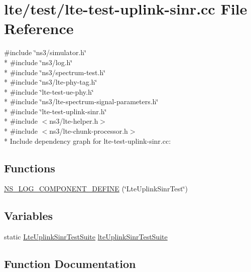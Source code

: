 \hypertarget{lte-test-uplink-sinr_8cc}{}\section{lte/test/lte-\/test-\/uplink-\/sinr.cc File Reference}
\label{lte-test-uplink-sinr_8cc}
{\ttfamily \#include \char`\"{}ns3/simulator.\+h\char`\"{}}\\*
{\ttfamily \#include \char`\"{}ns3/log.\+h\char`\"{}}\\*
{\ttfamily \#include \char`\"{}ns3/spectrum-\/test.\+h\char`\"{}}\\*
{\ttfamily \#include \char`\"{}ns3/lte-\/phy-\/tag.\+h\char`\"{}}\\*
{\ttfamily \#include \char`\"{}lte-\/test-\/ue-\/phy.\+h\char`\"{}}\\*
{\ttfamily \#include \char`\"{}ns3/lte-\/spectrum-\/signal-\/parameters.\+h\char`\"{}}\\*
{\ttfamily \#include \char`\"{}lte-\/test-\/uplink-\/sinr.\+h\char`\"{}}\\*
{\ttfamily \#include $<$ns3/lte-\/helper.\+h$>$}\\*
{\ttfamily \#include $<$ns3/lte-\/chunk-\/processor.\+h$>$}\\*
Include dependency graph for lte-\/test-\/uplink-\/sinr.cc\+:
\subsection*{Functions}
\begin{DoxyCompactItemize}
\item 
\hyperlink{lte-test-uplink-sinr_8cc_a5f272e82c9da19956f6892bca34099b4}{N\+S\+\_\+\+L\+O\+G\+\_\+\+C\+O\+M\+P\+O\+N\+E\+N\+T\+\_\+\+D\+E\+F\+I\+NE} (\char`\"{}Lte\+Uplink\+Sinr\+Test\char`\"{})
\end{DoxyCompactItemize}
\subsection*{Variables}
\begin{DoxyCompactItemize}
\item 
static \hyperlink{classLteUplinkSinrTestSuite}{Lte\+Uplink\+Sinr\+Test\+Suite} \hyperlink{lte-test-uplink-sinr_8cc_a8dec76a019a25af75d31f04b82398fb9}{lte\+Uplink\+Sinr\+Test\+Suite}
\end{DoxyCompactItemize}


\subsection{Function Documentation}
